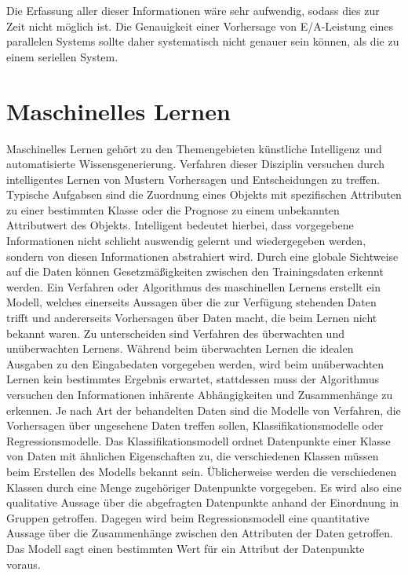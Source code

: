 \documentclass[
	12pt,
	a4paper,
	BCOR10mm,
	DIV14,
	listof=totoc,
	bibliography=totoc,
	headsepline
]{scrreprt}
\begin{document}
Die Erfassung aller dieser Informationen wäre sehr aufwendig, sodass dies zur Zeit nicht möglich ist. Die Genauigkeit einer Vorhersage von E/A-Leistung eines parallelen Systems sollte daher systematisch nicht genauer sein können, als die zu einem seriellen System.




\section{Maschinelles Lernen}
\label{ML}
Maschinelles Lernen gehört zu den Themengebieten künstliche Intelligenz und automatisierte Wissensgenerierung. Verfahren dieser Disziplin versuchen durch intelligentes Lernen von Mustern Vorhersagen und Entscheidungen zu treffen.
Typische Aufgabsen sind die Zuordnung eines Objekts mit spezifischen Attributen zu einer bestimmten Klasse oder die Prognose zu einem unbekannten Attributwert des Objekts. 
Intelligent bedeutet hierbei, dass vorgegebene Informationen nicht schlicht auswendig gelernt und wiedergegeben werden, sondern von diesen Informationen abstrahiert wird. Durch eine globale Sichtweise auf die Daten können Gesetzmäßigkeiten zwischen den Trainingsdaten erkennt werden.
Ein Verfahren oder Algorithmus des maschinellen Lernens erstellt ein Modell, welches einerseits Aussagen über die zur Verfügung stehenden Daten trifft und andererseits Vorhersagen über Daten macht, die beim Lernen nicht bekannt waren. 
Zu unterscheiden sind Verfahren des überwachten und unüberwachten Lernens. Während beim überwachten Lernen die idealen Ausgaben zu den Eingabedaten vorgegeben werden, wird beim unüberwachten Lernen kein bestimmtes Ergebnis erwartet, stattdessen muss der Algorithmus versuchen den Informationen inhärente Abhängigkeiten und Zusammenhänge zu erkennen.
Je nach Art der behandelten Daten sind die Modelle von Verfahren, die Vorhersagen über ungesehene Daten treffen sollen, Klassifikationsmodelle oder Regressionsmodelle. Das Klassifikationsmodell ordnet Datenpunkte einer Klasse von Daten mit ähnlichen Eigenschaften zu, die verschiedenen Klassen müssen beim Erstellen des Modells bekannt sein. Üblicherweise werden die verschiedenen Klassen durch eine Menge zugehöriger Datenpunkte vorgegeben. Es wird also eine qualitative Aussage über die abgefragten Datenpunkte anhand der Einordnung in Gruppen getroffen.
Dagegen wird beim Regressionsmodell eine quantitative Aussage über die Zusammenhänge zwischen den Attributen der Daten getroffen. Das Modell sagt einen bestimmten Wert für ein Attribut der Datenpunkte voraus.  
\end{document}
